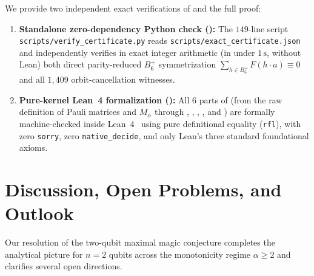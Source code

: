 \documentclass[11pt,a4paper]{article}
\theoremstyle{plain}
\theoremstyle{definition}
\theoremstyle{remark}
\newcommand{\Bplus}{B_6^+}
\newcommand{\code}[1]{\texttt{\small #1}}
\begin{document}
We provide two independent exact verifications of  and the full proof:
\begin{enumerate}[label=\arabic*., leftmargin=1.8em, itemsep=2pt]
  \item \textbf{Standalone zero-dependency Python check ():} The $149$-line script \code{scripts/\allowbreak verify\_\allowbreak certificate.py} reads \code{scripts/\allowbreak exact\_\allowbreak certificate.json} and independently verifies in exact integer arithmetic (in under $1\,\mathrm{s}$, without Lean) both direct parity-reduced $\Bplus$ symmetrization $\sum_{h\in\Bplus} F(h\cdot a) \equiv 0$ and all $1{,}409$ orbit-cancellation witnesses.
  \item \textbf{Pure-kernel Lean~4 formalization ():} All $6$ parts of  (from the raw definition of Pauli matrices and $M_\alpha$ through , , , , and ) are formally machine-checked inside Lean~4~\cite{deMouraUllrich2021,Mathlib2020} using pure definitional equality (\code{rfl}), with zero \code{sorry}, zero \code{native\_decide}, and only Lean's three standard foundational axioms.
\end{enumerate}

\section{Discussion, Open Problems, and Outlook}
\label{sec:discussion}

Our resolution of the two-qubit maximal magic conjecture completes the analytical picture for $n = 2$ qubits across the monotonicity regime $\alpha \ge 2$ and clarifies several open directions.
\end{document}
